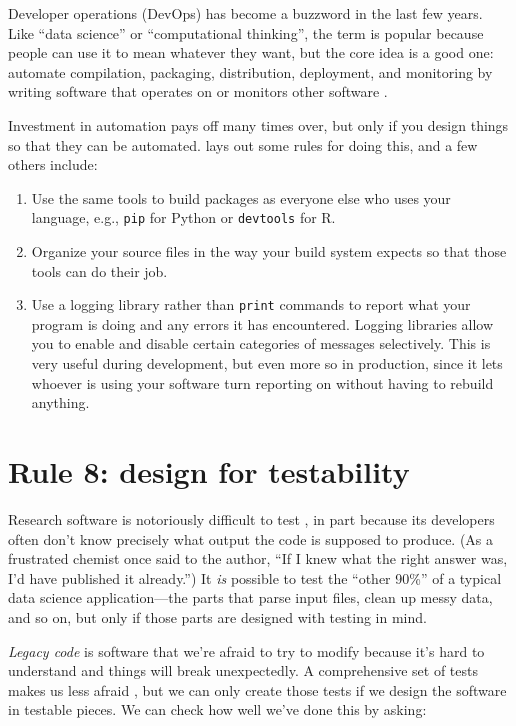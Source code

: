 \documentclass[10pt,letterpaper]{article}
\begin{document}
Developer operations (DevOps) has become a buzzword in the last few years.
Like ``data science'' or ``computational thinking'',
the term is popular because people can use it to mean whatever they want,
but the core idea is a good one:
automate compilation, packaging, distribution, deployment, and monitoring
by writing software that operates on or monitors other software \cite{Kim2016,Forsgren2018}.

Investment in automation pays off many times over,
but only if you design things so that they can be automated.
\cite{Taschuk2017} lays out some rules for doing this,
and a few others include:

\begin{enumerate}

\item
  Use the same tools to build packages as everyone else who uses your language,
  e.g., \texttt{pip} for Python or \texttt{devtools} for R.

\item
  Organize your source files in the way your build system expects
  so that those tools can do their job.

\item
  Use a logging library rather than \texttt{print} commands
  to report what your program is doing and any errors it has encountered.
  Logging libraries allow you to enable and disable certain categories of messages selectively.
  This is very useful during development,
  but even more so in production,
  since it lets whoever is using your software turn reporting on
  without having to rebuild anything.

\end{enumerate}

\section*{Rule 8: design for testability}

Research software is notoriously difficult to test \cite{Hook2009,Kanewala2014},
in part because its developers often don't know precisely what output the code is supposed to produce.
(As a frustrated chemist once said to the author,
``If I knew what the right answer was, I'd have published it already.'')
It \emph{is} possible to test the ``other 90\%'' of a typical data science application---the parts that
parse input files,
clean up messy data,
and so on,
but only if those parts are designed with testing in mind.

\emph{Legacy code} is software that we're afraid to try to modify
because it's hard to understand and things will break unexpectedly.
A comprehensive set of tests makes us less afraid \cite{Feathers2004},
but we can only create those tests if we design the software in testable pieces.
We can check how well we've done this by asking:
\end{document}
